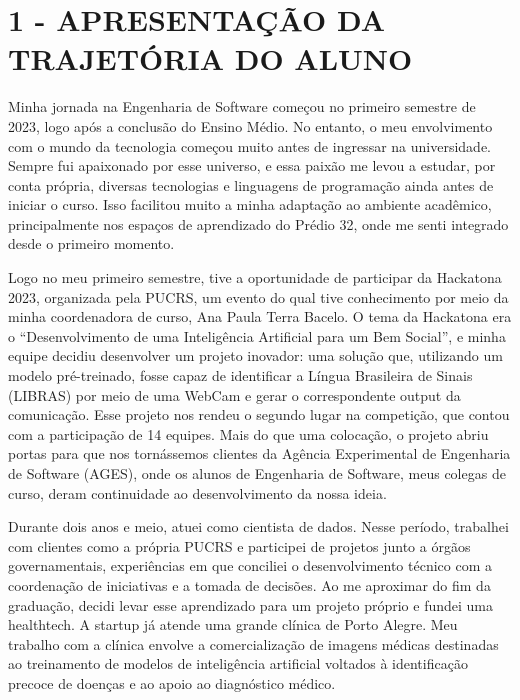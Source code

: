 \hypertarget{__RefHeading___Toc4729_3118176633}{}
\hypertarget{_Toc45627141}{}
\chapter*{1 - APRESENTAÇÃO DA TRAJETÓRIA DO ALUNO}
\label{ages-iv:trajectory}
\indent \originaltab{}Minha jornada na Engenharia de Software começou no primeiro semestre de 2023, logo após a conclusão do Ensino Médio. No entanto, o meu envolvimento com o mundo da tecnologia começou muito antes de ingressar na universidade. Sempre fui apaixonado por esse universo, e essa paixão me levou a estudar, por conta própria, diversas tecnologias e linguagens de programação ainda antes de iniciar o curso. Isso facilitou muito a minha adaptação ao ambiente acadêmico, principalmente nos espaços de aprendizado do Prédio 32, onde me senti integrado desde o primeiro momento.\par
\indent Logo no meu primeiro semestre, tive a oportunidade de participar da Hackatona 2023, organizada pela PUCRS, um evento do qual tive conhecimento por meio da minha coordenadora de curso, Ana Paula Terra Bacelo. O tema da Hackatona era o “Desenvolvimento de uma Inteligência Artificial para um Bem Social”, e minha equipe decidiu desenvolver um projeto inovador: uma solução que, utilizando um modelo pré-treinado, fosse capaz de identificar a Língua Brasileira de Sinais (LIBRAS) por meio de uma WebCam e gerar o correspondente output da comunicação. Esse projeto nos rendeu o segundo lugar na competição, que contou com a participação de 14 equipes. Mais do que uma colocação, o projeto abriu portas para que nos tornássemos clientes da Agência Experimental de Engenharia de Software (AGES), onde os alunos de Engenharia de Software, meus colegas de curso, deram continuidade ao desenvolvimento da nossa ideia.\par
\indent Durante dois anos e meio, atuei como cientista de dados. Nesse período, trabalhei com clientes como a própria PUCRS e participei de projetos junto a órgãos governamentais, experiências em que conciliei o desenvolvimento técnico com a coordenação de iniciativas e a tomada de decisões. Ao me aproximar do fim da graduação, decidi levar esse aprendizado para um projeto próprio e fundei uma \mbox{healthtech}. A startup já atende uma grande clínica de Porto Alegre. Meu trabalho com a clínica envolve a comercialização de imagens médicas destinadas ao treinamento de modelos de inteligência artificial voltados à identificação precoce de doenças e ao apoio ao diagnóstico médico.\par
